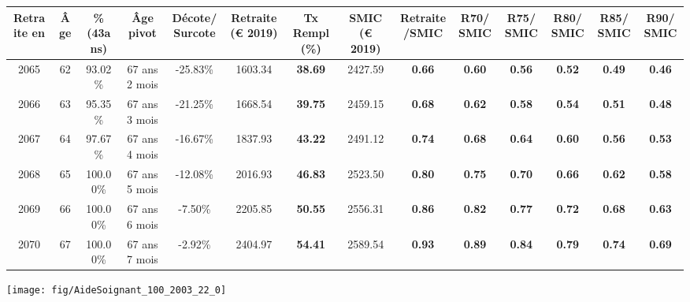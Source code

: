 \begin{adjustbox}{max width=\textwidth} 
\begin{tabular}[htb]{|c|c||c|c|c||c|c||c|c||c|c|c|c|c|} 
\hline 
 Retraite en &  Âge &  \%(43ans) &  Âge pivot &  Décote/Surcote &  Retraite (\euro{} 2019) &  Tx Rempl(\%) &  SMIC (\euro{} 2019) &  Retraite/SMIC &  R70/SMIC &  R75/SMIC &  R80/SMIC &  R85/SMIC &  R90/SMIC \\ 
\hline \hline 
 2065 &  62 &  93.02\% &  67 ans 2 mois &  -25.83\% &  1603.34 &  {\bf 38.69} &  2427.59 &  {\bf {\color{red} 0.66}} &  {\bf {\color{red} 0.60}} &  {\bf {\color{red} 0.56}} &  {\bf {\color{red} 0.52}} &  {\bf {\color{red} 0.49}} &  {\bf {\color{red} 0.46}} \\ 
\hline 
 2066 &  63 &  95.35\% &  67 ans 3 mois &  -21.25\% &  1668.54 &  {\bf 39.75} &  2459.15 &  {\bf {\color{red} 0.68}} &  {\bf {\color{red} 0.62}} &  {\bf {\color{red} 0.58}} &  {\bf {\color{red} 0.54}} &  {\bf {\color{red} 0.51}} &  {\bf {\color{red} 0.48}} \\ 
\hline 
 2067 &  64 &  97.67\% &  67 ans 4 mois &  -16.67\% &  1837.93 &  {\bf 43.22} &  2491.12 &  {\bf {\color{red} 0.74}} &  {\bf {\color{red} 0.68}} &  {\bf {\color{red} 0.64}} &  {\bf {\color{red} 0.60}} &  {\bf {\color{red} 0.56}} &  {\bf {\color{red} 0.53}} \\ 
\hline 
 2068 &  65 &  100.00\% &  67 ans 5 mois &  -12.08\% &  2016.93 &  {\bf 46.83} &  2523.50 &  {\bf {\color{red} 0.80}} &  {\bf {\color{red} 0.75}} &  {\bf {\color{red} 0.70}} &  {\bf {\color{red} 0.66}} &  {\bf {\color{red} 0.62}} &  {\bf {\color{red} 0.58}} \\ 
\hline 
 2069 &  66 &  100.00\% &  67 ans 6 mois &  -7.50\% &  2205.85 &  {\bf 50.55} &  2556.31 &  {\bf {\color{red} 0.86}} &  {\bf {\color{red} 0.82}} &  {\bf {\color{red} 0.77}} &  {\bf {\color{red} 0.72}} &  {\bf {\color{red} 0.68}} &  {\bf {\color{red} 0.63}} \\ 
\hline 
 2070 &  67 &  100.00\% &  67 ans 7 mois &  -2.92\% &  2404.97 &  {\bf 54.41} &  2589.54 &  {\bf {\color{red} 0.93}} &  {\bf {\color{red} 0.89}} &  {\bf {\color{red} 0.84}} &  {\bf {\color{red} 0.79}} &  {\bf {\color{red} 0.74}} &  {\bf {\color{red} 0.69}} \\ 
\hline 
\hline 
\end{tabular} 
\end{adjustbox} 
 
 \vspace{0.1cm} 

 {\hspace{-2.2cm}\texttt{[image: fig/AideSoignant\_100\_2003\_22\_0]}} 

